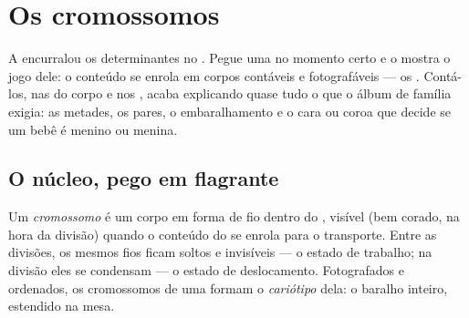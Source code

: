\chapter{Os cromossomos}\label{ch:g9:chromosomes}

A  encurralou os
determinantes no . Pegue uma  no momento certo e
o  mostra o jogo dele: o conteúdo se enrola em corpos
contáveis e fotografáveis --- os . Contá-los, nas
 do corpo e nos , acaba explicando quase tudo
o que o álbum de família exigia: as metades, os pares, o
embaralhamento e o cara ou coroa que decide se um bebê é
menino ou menina.

\section{O núcleo, pego em flagrante}

\begin{definition}[Os cromossomos]\label{def:g9:chromosomes:chromosomes}
Um \emph{cromossomo} é um corpo em forma
de fio dentro do , visível (bem corado, na hora da
divisão) quando o conteúdo do  se enrola para o
transporte. Entre as divisões, os mesmos fios ficam soltos e
invisíveis --- o estado de trabalho; na divisão eles se
condensam --- o estado de deslocamento. Fotografados e
ordenados, os cromossomos de uma  formam o
\emph{cariótipo} dela: o baralho inteiro,
estendido na mesa.
\end{definition}

